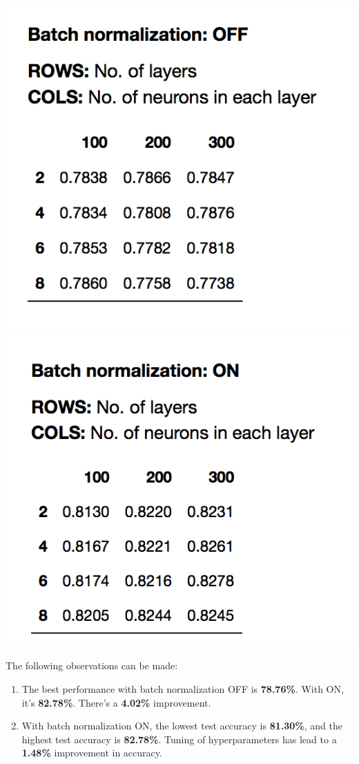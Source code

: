 \documentclass{article}
\begin{document}
\noindent\includegraphics{perf_batch_off}\\
\noindent\includegraphics{perf_batch_on}

\newpage
The following observations can be made:

\begin{enumerate}
\item{The best performance with batch normalization OFF is \textbf{78.76\%}. With ON, it's \textbf{82.78\%}. There's a \textbf{4.02\%} improvement.}
\item{With batch normalization ON, the lowest test accuracy is \textbf{81.30\%}, and the highest test accuracy is \textbf{82.78\%}. Tuning of hyperparameters has lead to a \textbf{1.48\%} improvement in accuracy.}
\end{enumerate}
\end{document}
